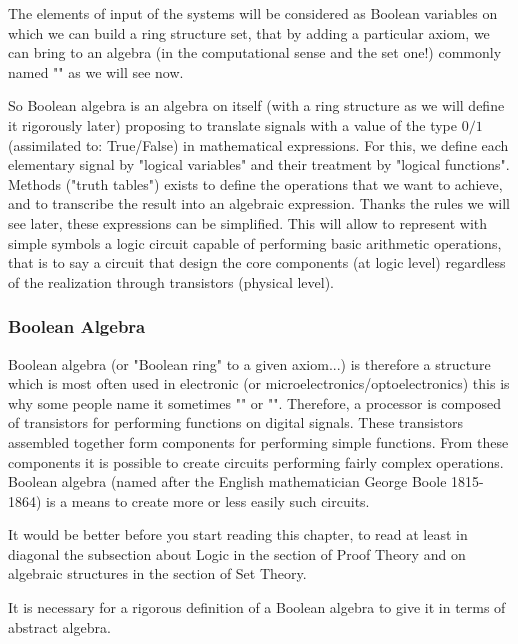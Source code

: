 		The elements of input of the systems will be considered as Boolean variables on which we can build a ring structure set, that by adding a particular axiom, we can bring to an algebra (in the computational sense and the set one!) commonly named "" as we will see now.
		
		So Boolean algebra is an algebra on itself (with a ring structure as we will define it rigorously later) proposing to translate signals with a value of the type $0/1$ (assimilated to: True/False) in mathematical expressions. For this, we define each elementary signal by "logical variables" and their treatment by "logical functions". Methods ("truth tables") exists to define the operations that we want to achieve, and to transcribe the result into an algebraic expression. Thanks the rules we will see later, these expressions can be simplified. This will allow to represent with simple symbols a logic circuit capable of performing basic arithmetic operations, that is to say a circuit that design the core components (at logic level) regardless of the realization through transistors (physical level).
	
	\subsubsection{Boolean Algebra}
	Boolean algebra (or "Boolean ring" to a given axiom...) is therefore a structure which is most often used in electronic (or microelectronics/optoelectronics) this is why some people name it sometimes "" or "". Therefore, a processor is composed of transistors for performing functions on digital signals. These transistors assembled together form components for performing simple functions. From these components it is possible to create circuits performing fairly complex operations. Boolean algebra (named after the English mathematician George Boole 1815-1864) is a means to create more or less easily such circuits.
	
	\begin{tcolorbox}[title=Remark,colframe=black,arc=10pt]
	It would be better before you start reading this chapter, to read at least in diagonal the subsection about Logic in the section of Proof Theory and on algebraic structures in the section of Set Theory.
	\end{tcolorbox}
	It is necessary for a rigorous definition of a Boolean algebra to give it in terms of abstract algebra.
	
